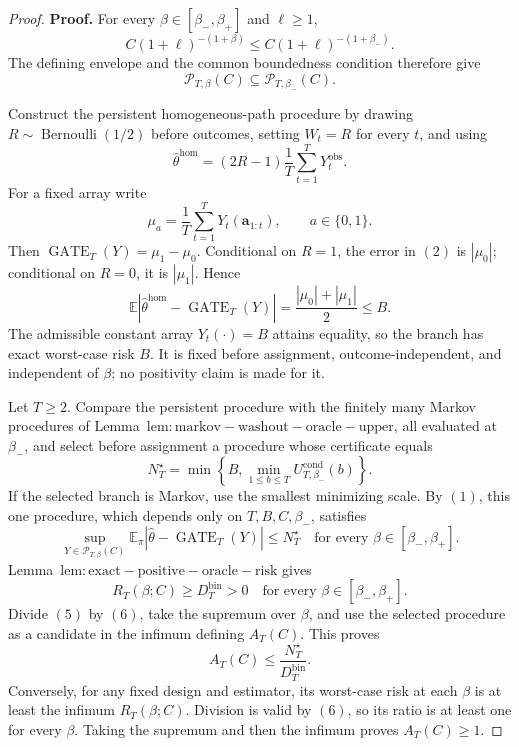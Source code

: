 \documentclass{article}
\begin{document}
\begin{proof}
\textbf{Proof.} For every \(\beta\in[\beta_-,\beta_+]\) and \(\ell\ge1\),
\[
C(1+\ell)^{-(1+\beta)}\le C(1+\ell)^{-(1+\beta_-)}.
\]
The defining envelope and the common boundedness condition therefore give
\[
\mathcal P_{T,\beta}(C)\subseteq\mathcal P_{T,\beta_-}(C).
\tag{1}
\]

Construct the persistent homogeneous-path procedure by drawing \(R\sim\operatorname{Bernoulli}(1/2)\) before outcomes, setting \(W_t=R\) for every \(t\), and using
\[
\widehat\theta^{\mathrm{hom}}=(2R-1)\frac1T\sum_{t=1}^T Y_t^{\mathrm{obs}}.
\tag{2}
\]
For a fixed array write
\[
\mu_a=\frac1T\sum_{t=1}^T Y_t(\mathbf a_{1:t}),\qquad a\in\{0,1\}.
\]
Then \(\operatorname{GATE}_T(Y)=\mu_1-\mu_0\). Conditional on \(R=1\), the error in \((2)\) is \(|\mu_0|\); conditional on \(R=0\), it is \(|\mu_1|\). Hence
\[
\mathbb E\left|\widehat\theta^{\mathrm{hom}}-\operatorname{GATE}_T(Y)\right|
=\frac{|\mu_0|+|\mu_1|}{2}\le B.
\tag{3}
\]
The admissible constant array \(Y_t(\cdot)=B\) attains equality, so the branch has exact worst-case risk \(B\). It is fixed before assignment, outcome-independent, and independent of \(\beta\); no positivity claim is made for it.

Let \(T\ge2\). Compare the persistent procedure with the finitely many Markov procedures of Lemma~\(\mathrm{lem:markov-washout-oracle-upper}\), all evaluated at \(\beta_-\), and select before assignment a procedure whose certificate equals
\[
N_T^\star=\min\left\{B,\min_{1\le b\le T}U_{T,\beta_-}^{\mathrm{cond}}(b)\right\}.
\tag{4}
\]
If the selected branch is Markov, use the smallest minimizing scale. By \((1)\), this one procedure, which depends only on \(T,B,C,\beta_-\), satisfies
\[
\sup_{Y\in\mathcal P_{T,\beta}(C)}
\mathbb E_\pi\left|\widehat\theta-\operatorname{GATE}_T(Y)\right|
\le N_T^\star
\quad\text{for every }\beta\in[\beta_-,\beta_+].
\tag{5}
\]
Lemma~\(\mathrm{lem:exact-positive-oracle-risk}\) gives
\[
R_T(\beta;C)\ge D_T^{\mathrm{bin}}>0
\quad\text{for every }\beta\in[\beta_-,\beta_+].
\tag{6}
\]
Divide \((5)\) by \((6)\), take the supremum over \(\beta\), and use the selected procedure as a candidate in the infimum defining \(A_T(C)\). This proves
\[
A_T(C)\le\frac{N_T^\star}{D_T^{\mathrm{bin}}}.
\tag{7}
\]
Conversely, for any fixed design and estimator, its worst-case risk at each \(\beta\) is at least the infimum \(R_T(\beta;C)\). Division is valid by \((6)\), so its ratio is at least one for every \(\beta\). Taking the supremum and then the infimum proves \(A_T(C)\ge1\).


\end{proof}
\end{document}

